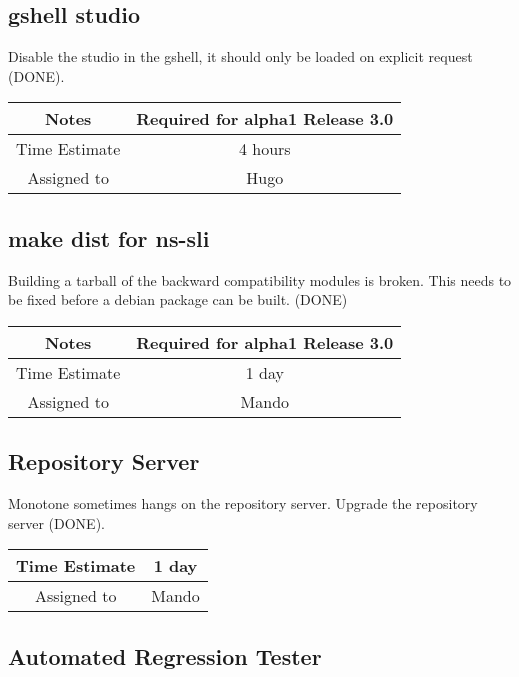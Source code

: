 \documentclass[12pt]{article}
\begin{document}
\subsection{gshell studio}

Disable the studio in the gshell, it should only be loaded on explicit
request (DONE).

{
  \vspace{5mm}
  \centering
  \begin{tabular}{|c|c|}
    \hline
    Notes
    & Required for alpha1 Release 3.0 \\
    \hline
    Time Estimate
    & 4 hours \\
    \hline
    Assigned to
    & Hugo \\
    \hline
  \end{tabular}
}


\subsection{make dist for ns-sli}

Building a tarball of the backward compatibility modules is broken.
This needs to be fixed before a debian package can be built. (DONE)

{
  \vspace{5mm}
  \centering
  \begin{tabular}{|c|c|}
    \hline
    Notes
    & Required for alpha1 Release 3.0 \\
    \hline
    Time Estimate
    & 1 day \\
    \hline
    Assigned to
    & Mando \\
    \hline
  \end{tabular}
}


\subsection{Repository Server}
\label{sec:repository-server}
Monotone sometimes hangs on the repository server.  Upgrade the
repository server (DONE).

{
  \vspace{5mm}
  \centering
  \begin{tabular}{|c|c|}
    \hline
    Time Estimate
    & 1 day \\
    \hline
    Assigned to
    & Mando \\
    \hline
  \end{tabular}
}


\subsection{Automated Regression Tester}
\end{document}
